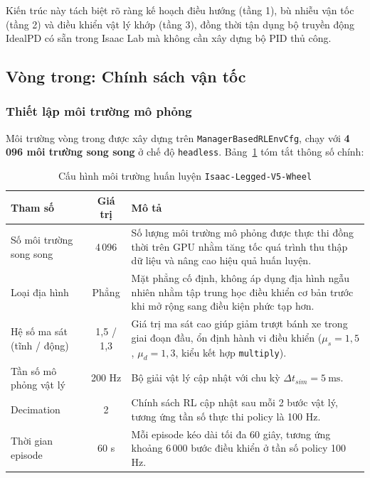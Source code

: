 Kiến trúc này tách biệt rõ ràng kế hoạch điều hướng (tầng 1),
bù nhiễu vận tốc (tầng 2) và điều khiển vật lý khớp
(tầng 3), đồng thời tận dụng bộ truyền động IdealPD có sẵn trong Isaac Lab
mà không cần xây dựng bộ PID thủ công.


\subsection{Vòng trong: Chính sách vận tốc }
\label{sec:inner_rl}

\subsubsection{Thiết lập môi trường mô phỏng}

Môi trường vòng trong được xây dựng trên \texttt{ManagerBasedRLEnvCfg}, 
chạy với \textbf{4\,096 môi trường song song} ở chế độ \texttt{headless}.
Bảng~\ref{tab:wheel_env} tóm tắt thông số chính:

\begin{table}[H]
    \centering
    \caption{Cấu hình môi trường huấn luyện \texttt{Isaac-Legged-V5-Wheel}}
    \label{tab:wheel_env}
    \renewcommand{\arraystretch}{1.3}
    \begin{tabular}{|p{4.0cm}|c|p{7.5cm}|}
    \hline
    \textbf{Tham số} & \textbf{Giá trị} & \textbf{Mô tả} \\
    \hline
    Số môi trường song song &
    4\,096 &
    Số lượng môi trường mô phỏng được thực thi đồng thời trên GPU nhằm tăng tốc quá trình thu thập dữ liệu và nâng cao hiệu quả huấn luyện. \\
    \hline
    Loại địa hình &
    Phẳng &
    Mặt phẳng cố định, không áp dụng địa hình ngẫu nhiên nhằm tập trung học điều khiển cơ bản trước khi mở rộng sang điều kiện phức tạp hơn. \\
    \hline
    Hệ số ma sát (tĩnh / động) &
    1{,}5 / 1{,}3 &
    Giá trị ma sát cao giúp giảm trượt bánh xe trong giai đoạn đầu, ổn định hành vi điều khiển ($\mu_s{=}1{,}5$, $\mu_d{=}1{,}3$, kiểu kết hợp \texttt{multiply}). \\
    \hline
    Tần số mô phỏng vật lý &
    200 Hz &
    Bộ giải vật lý cập nhật với chu kỳ $\Delta t_{sim}=5~\mathrm{ms}$. \\
    \hline
    Decimation &
    2 &
    Chính sách RL cập nhật sau mỗi 2 bước vật lý, tương ứng tần số thực thi policy là 100 Hz. \\
    \hline
    Thời gian episode &
    60 s &
    Mỗi episode kéo dài tối đa 60 giây, tương ứng khoảng 6\,000 bước điều khiển ở tần số policy 100 Hz. \\
    \hline
    \end{tabular}
\end{table}

